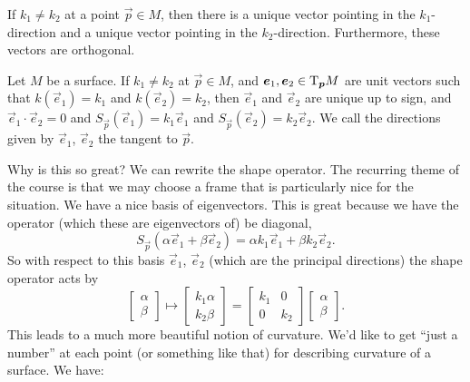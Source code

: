 \begin{remark}
If $k_{1}\neq k_{2}$ at a point $\vec{p}\in M$, then there is a unique
vector pointing in the $k_{1}$-direction and a unique vector pointing in
the $k_{2}$-direction. Furthermore, these vectors are orthogonal.
\end{remark}

\begin{proposition}
Let $M$ be a surface.
If $k_{1}\neq k_{2}$ at $\vec{p}\in M$,
and $\boldsymbol{e}_{1},\boldsymbol{e}_{2}\in\mathrm{T}_{\boldsymbol{p}}M$ are unit vectors such that
$k(\vec{e}_{1})=k_{1}$ and $k(\vec{e}_{2})=k_{2}$,
then $\vec{e}_{1}$ and $\vec{e}_{2}$ are unique up to sign, and
$\vec{e}_{1}\cdot\vec{e}_{2}=0$ and $S_{\vec{p}}(\vec{e}_{1})=k_{1}\vec{e}_{1}$
and $S_{\vec{p}}(\vec{e}_{2})=k_{2}\vec{e}_{2}$.
We call the directions given by $\vec{e}_{1}$, $\vec{e}_{2}$ the
 tangent to $\vec{p}$.
\end{proposition}

\M
Why is this so great? We can rewrite the shape operator. The recurring
theme of the course is that we may choose a frame that is particularly
nice for the situation. We have a nice basis of eigenvectors. This is
great because we have the operator (which these are eigenvectors of) be
diagonal,
\begin{equation}
S_{\vec{p}}(\alpha\vec{e}_{1} + \beta\vec{e}_{2}) = 
\alpha k_{1}\vec{e}_{1} + \beta k_{2}\vec{e}_{2}.
\end{equation}
So with respect to this basis $\vec{e}_{1}$, $\vec{e}_{2}$ (which are
the principal directions) the shape operator acts by
\begin{equation}
\begin{bmatrix}\alpha\\ \beta
\end{bmatrix}\mapsto
\begin{bmatrix}k_{1}\alpha\\ k_{2}\beta
\end{bmatrix}=\begin{bmatrix}k_{1} & 0\\0 & k_{2}
\end{bmatrix}
\begin{bmatrix}\alpha\\ \beta
\end{bmatrix}.
\end{equation}
This leads to a much more beautiful notion of curvature. We'd like to
get ``just a number'' at each point (or something like that) for
describing curvature of a surface. We have:

